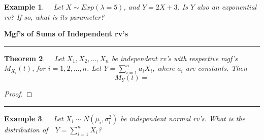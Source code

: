 \documentclass[12pt]{amsart}
\newtheorem{theorem}{Theorem}[section]
\newtheorem{example}[theorem]{Example}
\newcommand\gs{\sigma}
\newcommand\gl{\lambda}
\newcommand\mgfY{M_Y(t)}
\begin{document}
{\vfill

\begin{example} \ \  Let $X \sim Exp(\gl=5)$, and $Y = 2X+3$. \newline Is $Y$ also an exponential rv? If so, what is its parameter? 


\end{example}

\vfill

\newpage
\textbf{Mgf's of Sums of Independent rv's} 

\vspace{.5cm}
\hrule
\vspace{.5cm}

\begin{theorem} \ \  Let $X_1, X_2, \ldots, X_n$ be independent rv's with respective mgf's $M_{X_i}(t)$, for $i=1,2,\ldots,n$. Let $Y=\sum_{i=1}^n a_iX_i$, where $a_i$ are constants. Then
$$
\mgfY = %
$$
\end{theorem}

\begin{proof}
\end{proof}


\vspace{6cm}
\hrule
\vspace{.5cm}

\begin{example} \ \  Let $X_i \sim N(\mu_i, \gs_i^2)$ be independent normal rv's. \newline 
What is the distribution of\ \  $Y=\sum_{i=1}^n X_i$?
\end{example}


}
\end{document}
